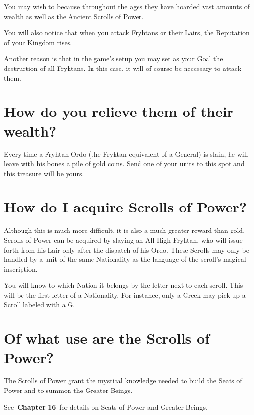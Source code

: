 
You may wish to because throughout the ages they have hoarded vast amounts of wealth as well as the Ancient Scrolls of Power.

You will also notice that when you attack Fryhtans or their Lairs, the Reputation of your Kingdom rises.

Another reason is that in the game’s setup you may set as your Goal the destruction of all Fryhtans. In this case, it will of course be necessary to attack them.

\section{How do you relieve them of their wealth?}

Every time a Fryhtan Ordo (the Fryhtan equivalent of a General) is slain, he will leave with his bones a pile of gold coins. Send one of your units to this spot and this treasure will be yours.

\section{How do I acquire Scrolls of Power?}

Although this is much more difficult, it is also a much greater reward than gold. Scrolls of Power can be acquired by slaying an All High Fryhtan, who will issue forth from his Lair only after the dispatch of his Ordo. These Scrolls may only be handled by a unit of the same Nationality as the language of the scroll’s magical inscription.

You will know to which Nation it belongs by the letter next to each scroll. This will be the first letter of a Nationality. For instance, only a Greek may pick up a Scroll labeled with a G.

\section{Of what use are the Scrolls of Power?}


The Scrolls of Power grant the mystical knowledge needed to build the Seats of Power and to summon the Greater Beings.

See \textbf{Chapter 16} for details on Seats of Power and Greater Beings.